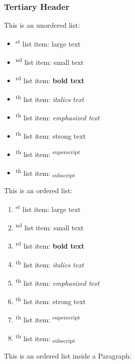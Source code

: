 \subsubsection{Tertiary Header}
\begin{paragraph}
This is an unordered list:\end{paragraph}
\begin{itemize}

    \item{}\textsuperscript{st} list item: {\Large large text}
    \item{}\textsuperscript{nd} list item: {\scriptsize small text}
    \item{}\textsuperscript{rd} list item: \textbf{bold text}
    \item{}\textsuperscript{th} list item: \textit{italics text}
    \item{}\textsuperscript{th} list item: \emph{emphasized text}
    \item{}\textsuperscript{th} list item: \textmd{strong text}
    \item{}\textsuperscript{th} list item: \textsuperscript{superscript}
    \item{}\textsuperscript{th} list item: \textsubscript{subscript}
\end{itemize}
\begin{paragraph}
This is an ordered list:\end{paragraph}
\begin{enumerate}

    \item{}\textsuperscript{st} list item: {\Large large text}
    \item{}\textsuperscript{nd} list item: {\scriptsize small text}
    \item{}\textsuperscript{rd} list item: \textbf{bold text}
    \item{}\textsuperscript{th} list item: \textit{italics text}
    \item{}\textsuperscript{th} list item: \emph{emphasized text}
    \item{}\textsuperscript{th} list item: \textmd{strong text}
    \item{}\textsuperscript{th} list item: \textsuperscript{superscript}
    \item{}\textsuperscript{th} list item: \textsubscript{subscript}
\end{enumerate}
\begin{paragraph}
This is an ordered list inside a Paragraph:\end{paragraph}
